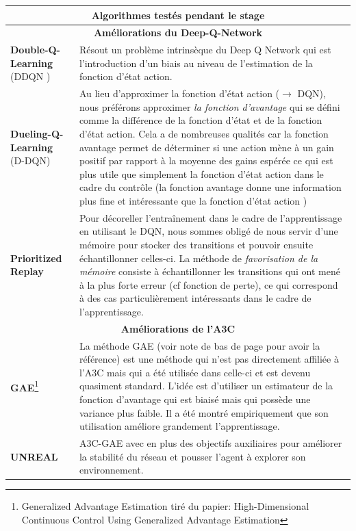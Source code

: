 \begin{center}
{
\begin{tabular}{ |p{3.3cm}|p{11cm}|  }
\hline
\multicolumn{2}{|c|}{Algorithmes testés pendant le stage} \\
\hline
\multicolumn{2}{|c|}{\bf{Améliorations du Deep-Q-Network}} \\
\hline 
\textbf{Double-Q-Learning} (DDQN \cite{DDQN}) & Résout un problème intrinsèque du Deep Q Network qui est l'introduction d'un biais au niveau de l'estimation de la fonction d'état action.\\\hline


\textbf{Dueling-Q-Learning} \: (D-DQN\cite{DUEL}) & Au lieu d'approximer la fonction d'état action ($\rightarrow$ DQN), nous préférons approximer \emph{la fonction d'avantage} qui se défini comme la différence de la fonction d'état et de la fonction d'état action. Cela a de nombreuses qualités car la fonction avantage permet de déterminer si une action mène à un gain positif par rapport à la moyenne des gains espérée ce qui est plus utile que simplement la fonction d'état action dans le cadre du contrôle (la fonction avantage donne une information plus fine et intéressante que la fonction d'état action )  \\\hline

\textbf{Prioritized Replay}\cite{REPLAY} & Pour décoreller l'entraînement dans le cadre de l'apprentissage  en utilisant le DQN, nous sommes obligé de nous servir d'une mémoire pour stocker des transitions et pouvoir ensuite échantillonner celles-ci. La méthode de \emph{favorisation de la mémoire} consiste à échantillonner les transitions qui ont mené à la plus forte erreur (cf fonction de perte), ce qui correspond à des cas particulièrement intéressants dans le cadre de l'apprentissage.  \\\hline

\multicolumn{2}{|c|}{\bf{Améliorations de l'A3C}} \\
\hline 

\textbf{GAE}\footnote{Generalized Advantage Estimation tiré du papier: High-Dimensional Continuous Control Using Generalized Advantage Estimation }\cite{GAE} & La méthode GAE (voir note de bas de page pour avoir la référence) est une méthode qui n'est pas directement affiliée à l'A3C mais qui a été utilisée dans celle-ci et est devenu quasiment standard. L'idée est d'utiliser un estimateur de la fonction d'avantage qui est biaisé mais qui possède une variance plus faible. Il a été montré empiriquement que son utilisation améliore grandement l'apprentissage. \\\hline
\textbf{UNREAL}& A3C-GAE avec en plus des objectifs auxiliaires pour améliorer la stabilité du réseau et pousser l'agent à explorer son environnement.
\\\hline
\end{tabular}
}
\end{center}


